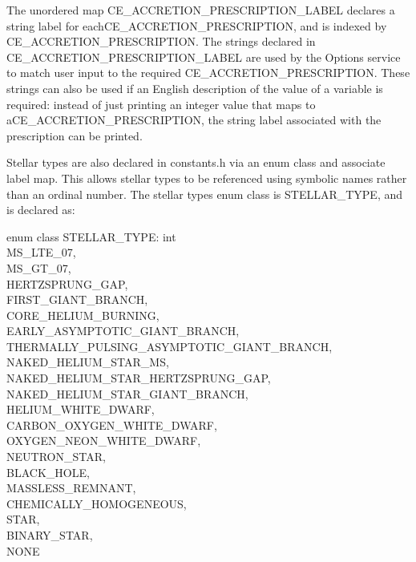 The unordered map CE\_ACCRETION\_PRESCRIPTION\_LABEL declares a string label for each\linebreak CE\_ACCRETION\_PRESCRIPTION, and is indexed by CE\_ACCRETION\_PRESCRIPTION. The strings declared in CE\_ACCRETION\_PRESCRIPTION\_LABEL are used by the Options service to match user input to the required CE\_ACCRETION\_PRESCRIPTION. These strings can also be used if an English description of the value of a variable is required: instead of just printing an integer value that maps to a\linebreak CE\_ACCRETION\_PRESCRIPTION, the string label associated with the prescription can be printed.

Stellar types are also declared in constants.h via an enum class and associate label map. This allows stellar types to be referenced using symbolic names rather than an ordinal number. The stellar types enum class is STELLAR\_TYPE, and is declared as:

\bigskip

\tabto{2em}enum class STELLAR\_TYPE: int \lcb \\
\tabto{4em}MS\_LTE\_07, \\
\tabto{4em}MS\_GT\_07, \\
\tabto{4em}HERTZSPRUNG\_GAP, \\
\tabto{4em}FIRST\_GIANT\_BRANCH, \\
\tabto{4em}CORE\_HELIUM\_BURNING, \\
\tabto{4em}EARLY\_ASYMPTOTIC\_GIANT\_BRANCH, \\
\tabto{4em}THERMALLY\_PULSING\_ASYMPTOTIC\_GIANT\_BRANCH, \\
\tabto{4em}NAKED\_HELIUM\_STAR\_MS, \\
\tabto{4em}NAKED\_HELIUM\_STAR\_HERTZSPRUNG\_GAP, \\
\tabto{4em}NAKED\_HELIUM\_STAR\_GIANT\_BRANCH, \\
\tabto{4em}HELIUM\_WHITE\_DWARF, \\
\tabto{4em}CARBON\_OXYGEN\_WHITE\_DWARF, \\
\tabto{4em}OXYGEN\_NEON\_WHITE\_DWARF, \\
\tabto{4em}NEUTRON\_STAR, \\
\tabto{4em}BLACK\_HOLE, \\
\tabto{4em}MASSLESS\_REMNANT, \\
\tabto{4em}CHEMICALLY\_HOMOGENEOUS, \\
\tabto{4em}STAR, \\
\tabto{4em}BINARY\_STAR, \\
\tabto{4em}NONE \\
\tabto{2em}\rcb{;}

